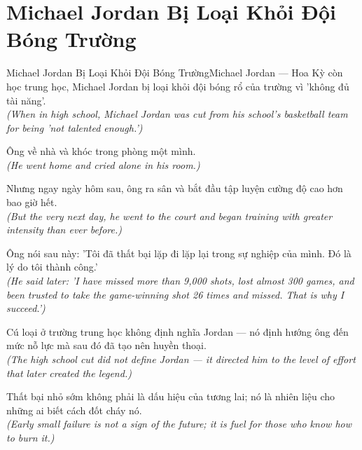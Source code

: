 \section{Michael Jordan Bị Loại Khỏi Đội Bóng Trường}
\begin{truyen}{Michael Jordan Bị Loại Khỏi Đội Bóng Trường}{Michael Jordan --- Hoa Kỳ}
 còn học trung học, Michael Jordan bị loại khỏi đội bóng rổ của trường vì 'không đủ tài năng'.\\[4pt]
\textit{(When in high school, Michael Jordan was cut from his school's basketball team for being 'not talented enough.')}

Ông về nhà và khóc trong phòng một mình.\\[4pt]
\textit{(He went home and cried alone in his room.)}

Nhưng ngay ngày hôm sau, ông ra sân và bắt đầu tập luyện cường độ cao hơn bao giờ hết.\\[4pt]
\textit{(But the very next day, he went to the court and began training with greater intensity than ever before.)}

Ông nói sau này: 'Tôi đã thất bại lặp đi lặp lại trong sự nghiệp của mình. Đó là lý do tôi thành công.'\\[4pt]
\textit{(He said later: 'I have missed more than 9,000 shots, lost almost 300 games, and been trusted to take the game-winning shot 26 times and missed. That is why I succeed.')}

Cú loại ở trường trung học không định nghĩa Jordan --- nó định hướng ông đến mức nỗ lực mà sau đó đã tạo nên huyền thoại.\\[4pt]
\textit{(The high school cut did not define Jordan --- it directed him to the level of effort that later created the legend.)}

\end{truyen}
\begin{baihoc}
  Thất bại nhỏ sớm không phải là dấu hiệu của tương lai; nó là nhiên liệu cho những ai biết cách đốt cháy nó.\\[4pt]
  \textit{(Early small failure is not a sign of the future; it is fuel for those who know how to burn it.)}
\end{baihoc}

